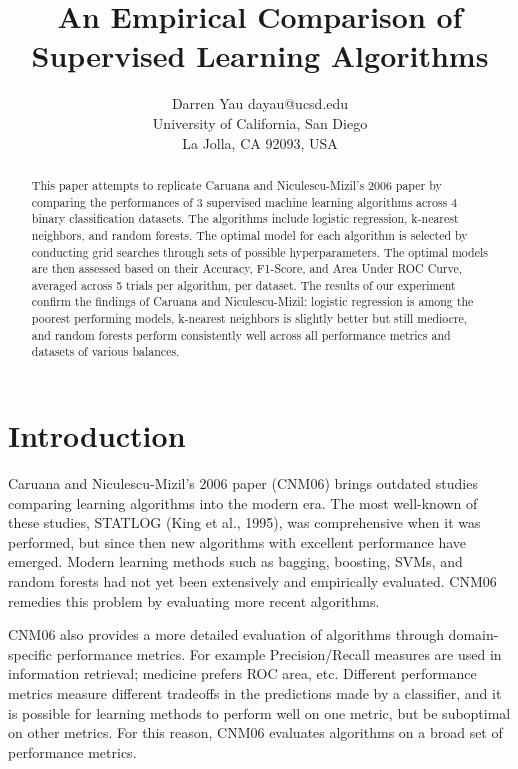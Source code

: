 \documentclass[twoside,11pt]{article}
\begin{document}
\title{An Empirical Comparison of Supervised Learning Algorithms}

\author{\name Darren Yau \email dayau@ucsd.edu\\
       \addr University of California, San Diego\\
       La Jolla, CA 92093, USA}
      

\maketitle

\begin{abstract}%
This paper attempts to replicate Caruana and Niculescu-Mizil’s 2006 paper by comparing the performances of 3 supervised machine learning algorithms across 4 binary classification datasets. The algorithms include logistic regression, k-nearest neighbors, and random forests. The optimal model for each algorithm is selected by conducting grid searches through sets of possible hyperparameters. The optimal models are then assessed based on their Accuracy, F1-Score, and Area Under ROC Curve, averaged across 5 trials per algorithm, per dataset. The results of our experiment confirm the findings of Caruana and Niculescu-Mizil: logistic regression is among the poorest performing models, k-nearest neighbors is slightly better but still mediocre, and random forests perform consistently well across all performance metrics and datasets of various balances.

\end{abstract}



\section{Introduction}
Caruana and Niculescu-Mizil’s 2006 paper (CNM06) brings outdated studies comparing learning algorithms into the modern era. The most well-known of these studies, STATLOG (King et al., 1995), was comprehensive when it was performed, but since then new algorithms with excellent performance have emerged. Modern learning methods such as bagging, boosting, SVMs, and random forests had not yet been extensively and empirically evaluated. CNM06 remedies this problem by evaluating more recent algorithms.

CNM06 also provides a more detailed evaluation of algorithms through domain-specific performance metrics. For example Precision/Recall measures are used in information retrieval; medicine prefers ROC area, etc. Different performance metrics measure different tradeoffs in the predictions made by a classifier, and it is possible for learning methods to perform well on one metric, but be suboptimal on other metrics. For this reason, CNM06 evaluates algorithms on a broad set of performance metrics.
\end{document}

